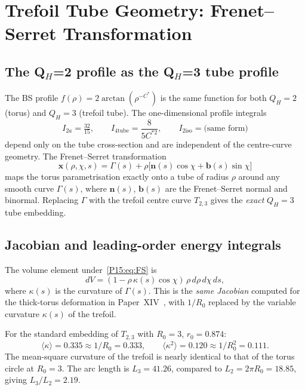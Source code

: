 \documentclass[11pt,a4paper]{article}
\theoremstyle{definition}\newtheorem{definition}[theorem]{Definition}
\theoremstyle{remark}
\newcommand{\QH}{Q_H}
\begin{document}
\section{Trefoil Tube Geometry: Frenet--Serret Transformation}
\label{P15:sec:geometry}

\subsection{The Q$_H$=2 profile as the Q$_H$=3 tube profile}

The BS profile $f(\rho)=2\arctan(\rho^{-C^*})$ is the same function
for both $\QH=2$ (torus) and $\QH=3$ (trefoil tube).
The one-dimensional profile integrals
\begin{equation}
  I_{2a} = \tfrac{32}{15},\qquad
  I_{4\mathrm{tube}} = \frac{8}{5C^{*2}},\qquad
  I_{2\mathrm{iso}} = \text{(same form)}
  \label{P15:eq:1Dints}
\end{equation}
depend only on the tube cross-section and are independent of the
centre-curve geometry.
The Frenet--Serret transformation
\begin{equation}
  \mathbf{x}(\rho,\chi,s) = \Gamma(s) + \rho\bigl[\mathbf{n}(s)\cos\chi
    + \mathbf{b}(s)\sin\chi\bigr]
  \label{P15:eq:FS}
\end{equation}
maps the torus parametrisation exactly onto a tube of radius $\rho$
around any smooth curve $\Gamma(s)$, where $\mathbf{n}(s)$,
$\mathbf{b}(s)$ are the Frenet--Serret normal and binormal.
Replacing $\Gamma$ with the trefoil centre curve $T_{2,3}$
gives the \emph{exact} $\QH=3$ tube embedding.

\subsection{Jacobian and leading-order energy integrals}

The volume element under~\eqref{P15:eq:FS} is
\begin{equation}
  dV = (1 - \rho\,\kappa(s)\cos\chi)\,\rho\,d\rho\,d\chi\,ds,
  \label{P15:eq:Jacobian}
\end{equation}
where $\kappa(s)$ is the curvature of $\Gamma(s)$.
This is the \emph{same Jacobian} computed for the thick-torus
deformation in Paper~XIV~\cite{Paper14}, with $1/R_0$ replaced
by the variable curvature $\kappa(s)$ of the trefoil.

For the standard embedding of $T_{2,3}$ with $R_0=3$, $r_0=0.874$:
\begin{equation}
  \langle\kappa\rangle = 0.335\approx 1/R_0 = 0.333,
  \qquad
  \langle\kappa^2\rangle = 0.120\approx 1/R_0^2 = 0.111.
  \label{P15:eq:kap_stats}
\end{equation}
The mean-square curvature of the trefoil is nearly identical to
that of the torus circle at $R_0=3$.
The arc length is $L_3=41.26$, compared to $L_2=2\pi R_0=18.85$,
giving $L_3/L_2=2.19$.
\end{document}
